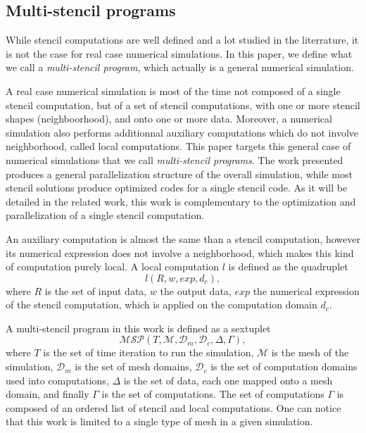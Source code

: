 \subsection{Multi-stencil programs}
\label{sect:multistencil}
While stencil computations are well defined and a lot studied in the literrature, it is not the case for real case numerical simulations. In this paper, we define what we call a \emph{multi-stencil program}, which actually is a general numerical simulation. 

A real case numerical simulation is most of the time not composed of a single stencil computation, but of a set of stencil computations, with one or more stencil shapes (neighboorhood), and onto one or more data. Moreover, a numerical simulation also performs additionnal auxiliary computations which do not involve neighborhood, called local computations. This paper targets this general case of numerical simulations that we call \emph{multi-stencil programs}. The work presented produces a general parallelization structure of the overall simulation, while most stencil solutions produce optimized codes for a single stencil code. As it will be detailed in the related work, this work is complementary to the optimization and parallelization of a single stencil computation.

An auxiliary computation is almost the same than a stencil computation, however its numerical expression does not involve a neighborhood, which makes this kind of computation purely local. A local computation $l$ is defined as the quadruplet
\begin{equation} 
l(R,w,exp,d_c),
\label{eq:loc}
\end{equation}
where $R$ is the set of input data, $w$ the output data, $exp$ the numerical expression of the stencil computation, which is applied on the computation domain $d_c$.

A multi-stencil program in this work is defined as a sextuplet
\begin{equation} 
\mathcal{MSP}(T,\mathcal{M},\mathcal{D}_m,\mathcal{D}_c,\Delta,\Gamma),
\label{eq:msp}
\end{equation}
where $T$ is the set of time iteration to run the simulation, $\mathcal{M}$ is the mesh of the simulation, $\mathcal{D}_m$ is the set of mesh domains, $\mathcal{D}_c$ is the set of computation domains used into computations, $\Delta$ is the set of data, each one mapped onto a mesh domain, and finally $\Gamma$ is the set of computations. The set of computations $\Gamma$ is composed of an ordered list of stencil and local computations. One can notice that this work is limited to a single type of mesh in a given simulation.

